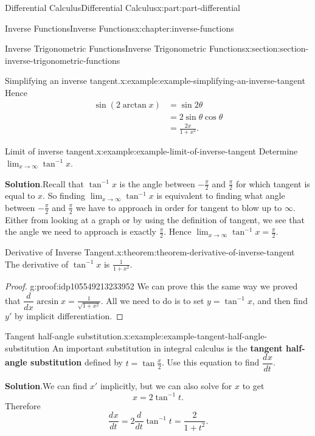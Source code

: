 \documentclass[twoside,10pt,]{book}
\newcommand{\blocktitlefont}{\relax}
\newcommand{\terminology}[1]{\textbf{#1}}
\numberwithin{equation}{part}
\newcommand{\dv}[3][]{\dfrac{d^{#1} #2}{d #3^{#1}}}
\begin{document}
\begin{partptx}{Differential Calculus}{}{Differential Calculus}{}{}{x:part:part-differential}
\begin{chapterptx}{Inverse Functions}{}{Inverse Functions}{}{}{x:chapter:inverse-functions}
\begin{sectionptx}{Inverse Trigonometric Functions}{}{Inverse Trigonometric Functions}{}{}{x:section:section-inverse-trigonometric-functions}
\begin{example}{Simplifying an inverse tangent.}{x:example:example-simplifying-an-inverse-tangent}
Hence%
\begin{align*}
\sin(2\arctan x) & = \sin2\theta \\
& = 2\sin\theta\cos\theta \\
& = \frac{2x}{1+x^{2}}. 
\end{align*}
%
\end{example}
\begin{example}{Limit of inverse tangent.}{x:example:example-limit-of-inverse-tangent}%
Determine \(\lim_{x\to\infty}\tan^{-1}x\).%
\par\smallskip%
\noindent\textbf{\blocktitlefont Solution}.\hypertarget{g:solution:idp105549213228064}{}\quad{}Recall that \(\tan^{-1}x\) is the angle between \(-\frac{\pi}{2}\) and \(\frac{\pi}{2}\) for which tangent is equal to \(x\). So finding \(\lim_{x\to\infty}\tan^{-1}x\) is equivalent to finding what angle between \(-\frac{\pi}{2}\) and \(\frac{\pi}{2}\) we have to approach in order for tangent to blow up to \(\infty\). Either from looking at a graph or by using the definition of tangent, we see that the angle we need to approach is exactly \(\frac{\pi}{2}\). Hence \(\lim_{x\to\infty}\tan^{-1}x = \frac{\pi}{2}\).%
\end{example}
\begin{theorem}{Derivative of Inverse Tangent.}{}{x:theorem:theorem-derivative-of-inverse-tangent}%
The derivative of \(\tan^{-1}x\) is \(\frac{1}{1+x^{2}}\).%
\end{theorem}
\begin{proof}{}{g:proof:idp105549213233952}
We can prove this the same way we proved that \(\dv{}{x}\arcsin x = \frac{1}{\sqrt{1+x^{2}}}\). All we need to do is to set \(y = \tan^{-1}x\), and then find \(y'\) by implicit differentiation.%
\end{proof}
\begin{example}{Tangent half-angle substitution.}{x:example:example-tangent-half-angle-substitution}%
An important substitution in integral calculus is the \terminology{tangent half-angle substitution} defined by \(t = \tan\frac{x}{2}\). Use this equation to find \(\dv{x}{t}\).%
\par\smallskip%
\noindent\textbf{\blocktitlefont Solution}.\hypertarget{g:solution:idp105549213237536}{}\quad{}We can find \(x'\) implicitly, but we can also solve for \(x\) to get%
\begin{equation*}
x = 2\tan^{-1}t.
\end{equation*}
Therefore%
\begin{equation*}
\dv{x}{t} = 2\dv{}{t}\tan^{-1}t = \frac{2}{1+t^{2}}.

\end{equation*}
\end{example}
\end{sectionptx}
\end{chapterptx}
\end{partptx}
\end{document}
